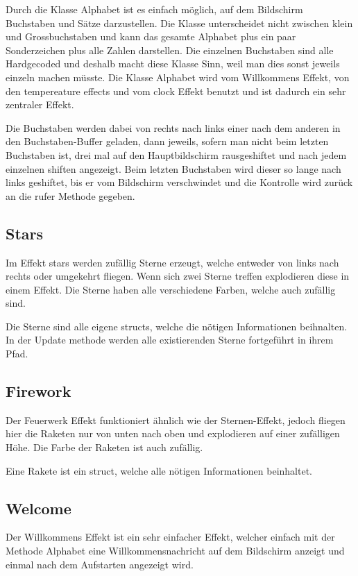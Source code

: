 \documentclass[12pt,a4paper]{article}
\begin{document}
Durch die Klasse Alphabet ist es einfach möglich, auf dem Bildschirm Buchstaben und Sätze darzustellen. Die Klasse unterscheidet nicht zwischen klein und Grossbuchstaben und kann das gesamte Alphabet plus ein paar Sonderzeichen plus alle Zahlen darstellen. Die einzelnen Buchstaben sind alle Hardgecoded und deshalb macht diese Klasse Sinn, weil man dies sonst jeweils einzeln machen müsste. Die Klasse Alphabet wird vom Willkommens Effekt, von den tempereature effects und vom clock Effekt benutzt und ist dadurch ein sehr zentraler Effekt.

Die Buchstaben werden dabei von rechts nach links einer nach dem anderen in den Buchstaben-Buffer geladen, dann jeweils, sofern man nicht beim letzten Buchstaben ist, drei mal auf den Hauptbildschirm rausgeshiftet und nach jedem einzelnen shiften angezeigt. Beim letzten Buchstaben wird dieser so lange nach links geshiftet, bis er vom Bildschirm verschwindet und die Kontrolle wird zurück an die rufer Methode gegeben.

\subsection{Stars}

Im Effekt stars werden zufällig Sterne erzeugt, welche entweder von links nach rechts oder umgekehrt fliegen. Wenn sich zwei Sterne treffen explodieren diese in einem Effekt. Die Sterne haben alle verschiedene Farben, welche auch zufällig sind. 

Die Sterne sind alle eigene structs, welche die nötigen Informationen beihnalten. In der Update methode werden alle existierenden Sterne fortgeführt in ihrem Pfad.

\subsection{Firework}

Der Feuerwerk Effekt funktioniert ähnlich wie der Sternen-Effekt, jedoch fliegen hier die Raketen nur von unten nach oben und explodieren auf einer zufälligen Höhe. Die Farbe der Raketen ist auch zufällig.

Eine Rakete ist ein struct, welche alle nötigen Informationen beinhaltet.

\subsection{Welcome}

Der Willkommens Effekt ist ein sehr einfacher Effekt, welcher einfach mit der Methode Alphabet eine Willkommensnachricht auf dem Bildschirm anzeigt und einmal nach dem Aufstarten angezeigt wird.
\end{document}

